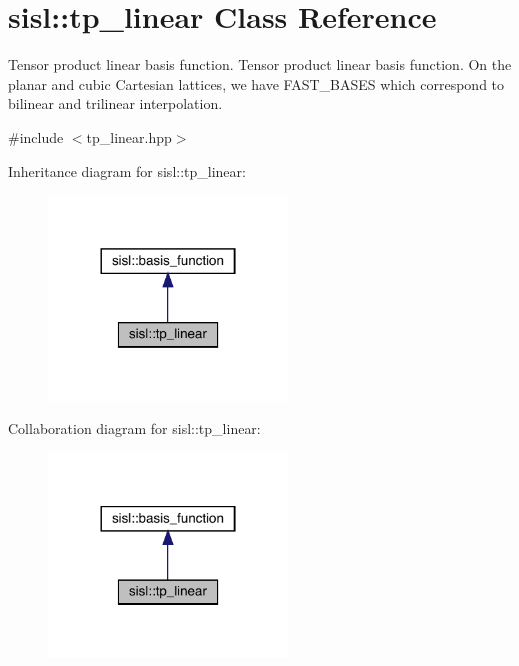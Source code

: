 \hypertarget{classsisl_1_1tp__linear}{}\section{sisl\+:\+:tp\+\_\+linear Class Reference}
\label{classsisl_1_1tp__linear}


Tensor product linear basis function. Tensor product linear basis function. On the planar and cubic Cartesian lattices, we have F\+A\+S\+T\+\_\+\+B\+A\+S\+ES which correspond to bilinear and trilinear interpolation.  




{\ttfamily \#include $<$tp\+\_\+linear.\+hpp$>$}



Inheritance diagram for sisl\+:\+:tp\+\_\+linear\+:\nopagebreak
\begin{figure}[H]
\begin{center}
\leavevmode
\includegraphics[width=180pt]{classsisl_1_1tp__linear__inherit__graph}
\end{center}
\end{figure}


Collaboration diagram for sisl\+:\+:tp\+\_\+linear\+:\nopagebreak
\begin{figure}[H]
\begin{center}
\leavevmode
\includegraphics[width=180pt]{classsisl_1_1tp__linear__coll__graph}
\end{center}
\end{figure}
